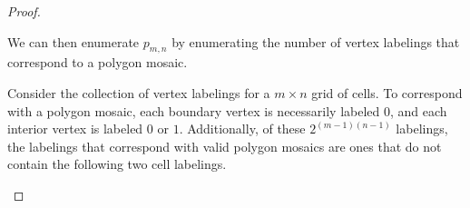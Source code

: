 \documentclass[12pt]{article}
\theoremstyle{plain}
\theoremstyle{definition}
\theoremstyle{remark}
\theoremstyle{definition}
\newcommand{\cell}[4]{ \draw[thick] ( #1 , #2 ) rectangle ( #3 , #4 );}
\newcommand{\lablvertex}[3]{\node[shape=circle,draw=none,fill=white, inner sep=2pt,minimum size=5pt] (A) at ( #1 , #2 ) {#3};}
\begin{document}
\begin{proof}
\begin{center}
\end{center}

We can then enumerate $p_{m,n}$ by enumerating the number of vertex labelings that correspond to a polygon mosaic. 

Consider the collection of vertex labelings for a $m \times n$ grid of cells. To correspond with a polygon mosaic, each boundary vertex is necessarily labeled $0$, and each interior vertex is labeled $0$ or $1$. Additionally, of these $2^{(m-1)(n-1)}$ labelings, the labelings that correspond with valid polygon mosaics are ones that do not contain the following two cell labelings.

\begin{center}
\end{center}
\end{proof}
\end{document}
